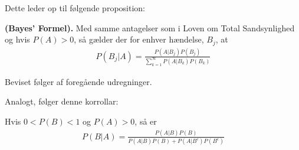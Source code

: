 Dette leder op til følgende proposition:\\
\begin{minipage}\textwidth
\begin{pro} \textbf{(Bayes' Formel).} %
\newline
Med samme antagelser som i Loven om Total Sandsynlighed og hvis $P(A)>0$, så gælder der for enhver hændelse, $B_j$, at
\begin{align*}
    P(B_j|A)=\frac{P(A|B_j)P(B_j)}{\sum_{k=1}^\infty P(A|B_k)P(B_k)}
\end{align*}
\end{pro}
\end{minipage}
\begin{bev}
Beviset følger af foregående udregninger.
\end{bev}

Analogt, følger denne korrollar:\\
\begin{minipage}\textwidth
\begin{kor} \textbf{} %
\newline
Hvis $0<P(B)<1$ og $P(A)>0$, så er
\begin{align*}
    P(B|A)=\frac{P(A|B)P(B)}{P(A|B)P(B)+P(A|B^c)P(B^c)}
\end{align*}
\end{kor}
\end{minipage}
\fi